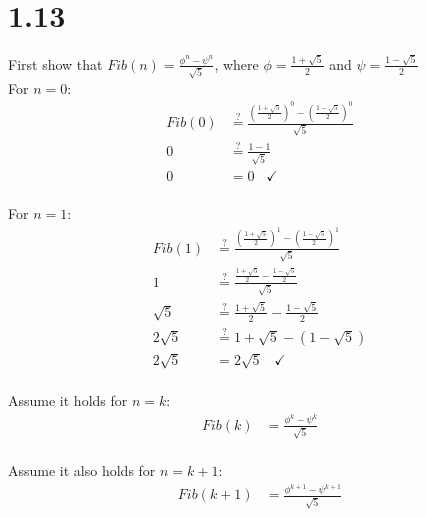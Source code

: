 \documentclass{report}
\newcommand{\?}{\stackrel{?}{=}}
\newcommand{\<}{\stackrel{?}{<}}
\begin{document}
\section*{1.13}
First show that $Fib(n) = \displaystyle\frac{\phi^n - \psi^n}{\sqrt{5}}$, where $\phi = \displaystyle\frac{1 + \sqrt{5}}{2}$ and $\psi = \displaystyle\frac{1 - \sqrt{5}}{2}$\\

For $n = 0$:
\begin{align}
Fib(0) &\? \frac{(\frac{1 + \sqrt{5}}{2})^0 - (\frac{1 - \sqrt{5}}{2})^0}{\sqrt{5}}\\
0 &\? \frac{1 - 1}{\sqrt{5}}\\
0 &= 0 \;\;\; \checkmark
\end{align}\\

For $n = 1$:
\begin{align}
Fib(1) &\? \frac{(\frac{1 + \sqrt{5}}{2})^1 - (\frac{1 - \sqrt{5}}{2})^1}{\sqrt{5}}\\
1 &\? \frac{\frac{1 + \sqrt{5}}{2} - \frac{1 - \sqrt{5}}{2}}{\sqrt{5}}\\
\sqrt{5} &\? \frac{1 + \sqrt{5}}{2} - \frac{1 - \sqrt{5}}{2}\\
2\sqrt{5} &\? 1 + \sqrt{5} - (1 - \sqrt{5})\\
2\sqrt{5} &= 2\sqrt{5}  \;\;\; \checkmark
\end{align}\\

Assume it holds for $n = k$:
\begin{align}
Fib(k) &= \frac{\phi^k - \psi^k}{\sqrt{5}}
\end{align}\\

Assume it also holds for $n = k + 1$:
\begin{align}
Fib(k + 1) &= \frac{\phi^{k + 1} - \psi^{k + 1}}{\sqrt{5}}
\end{align}\\
\end{document}
